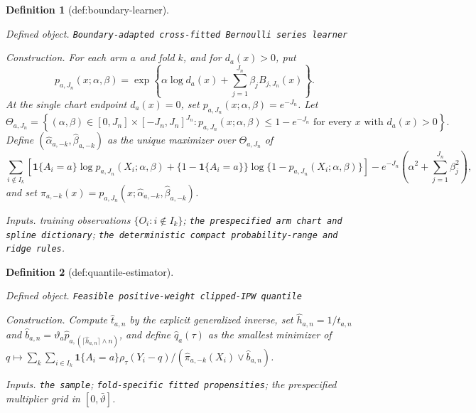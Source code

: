 \documentclass{article}
\newtheorem{definition}{Definition}
\begin{document}
\begin{definition}[def:boundary-learner]\label{def:boundary-learner}
\par\smallskip\noindent\emph{Defined object.} \texttt{Boundary-\allowbreak{}adapted cross-\allowbreak{}fitted Bernoulli series learner}
\par\smallskip\noindent\emph{Construction.} For each arm \(a\) and fold \(k\), and for \(d_a(x)>0\), put
\[
p_{a,J_n}(x;\alpha,\beta)
=\exp\!\left\{\alpha\log d_a(x)+\sum_{j=1}^{J_n}\beta_jB_{j,J_n}(x)\right\}.
\]
At the single chart endpoint \(d_a(x)=0\), set
\(p_{a,J_n}(x;\alpha,\beta)=e^{-J_n}\).  Let
\[
\Theta_{a,J_n}
=\left\{(\alpha,\beta)\in[0,J_n]\times[-J_n,J_n]^{J_n}:
p_{a,J_n}(x;\alpha,\beta)\le 1-e^{-J_n}
\text{ for every }x\text{ with }d_a(x)>0\right\}.
\]
Define \((\widehat\alpha_{a,-k},\widehat\beta_{a,-k})\) as the unique maximizer over \(\Theta_{a,J_n}\) of
\[
\sum_{i\notin I_k}
\left[
\mathbf 1\{A_i=a\}\log p_{a,J_n}(X_i;\alpha,\beta)
+\{1-\mathbf 1\{A_i=a\}\}
\log\{1-p_{a,J_n}(X_i;\alpha,\beta)\}
\right]
-e^{-J_n}\left(\alpha^2+\sum_{j=1}^{J_n}\beta_j^2\right),
\]
and set \(\widehat\pi_{a,-k}(x)=p_{a,J_n}(x;\widehat\alpha_{a,-k},\widehat\beta_{a,-k})\).
\par\smallskip\noindent\emph{Inputs.} training observations \(\{O_i:i\notin I_k\}\); \texttt{the prespecified arm chart and spline dictionary}; \texttt{the deterministic compact probability-\allowbreak{}range and ridge rules}.
\end{definition}

\begin{definition}[def:quantile-estimator]\label{def:quantile-estimator}
\par\smallskip\noindent\emph{Defined object.} \texttt{Feasible positive-\allowbreak{}weight clipped-\allowbreak{}IPW quantile}
\par\smallskip\noindent\emph{Construction.} Compute \(\widehat t_{a,n}\) by the explicit generalized inverse, set \(\widehat h_{a,n}=1/\widehat t_{a,n}\) and \(\widehat b_{a,n}=\vartheta_a\widehat p_{a,(\lceil\widehat h_{a,n}\rceil\wedge n)}\), and define \(\widehat q_a(\tau)\) as the smallest minimizer of \(q\mapsto\sum_k\sum_{i\in I_k}\mathbf1\{A_i=a\}\rho_\tau(Y_i-q)/(\widehat\pi_{a,-k}(X_i)\vee\widehat b_{a,n})\).
\par\smallskip\noindent\emph{Inputs.} \texttt{the sample}; \texttt{fold-\allowbreak{}specific fitted propensities}; the prespecified multiplier grid in \([0,\bar\vartheta]\).
\end{definition}
\end{document}

